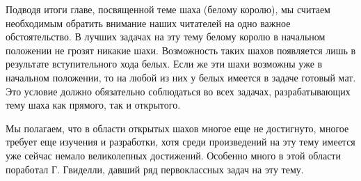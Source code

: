 Подводя итоги главе, посвященной теме шаха (белому королю), мы считаем необходимым обратить внимание наших читателей на одно важное обстоятельство. В лучших задачах на эту тему белому королю в начальном положении не грозят никакие шахи. Возможность таких шахов появляется лишь в результате вступительного хода белых. Если же эти шахи возможны уже в начальном положении, то на любой из них у белых имеется в задаче готовый мат. Это условие должно обязательно соблюдаться во всех задачах, разрабатывающих тему шаха как прямого, так и открытого.

Мы полагаем, что в области открытых шахов многое еще не достигнуто, многое требует еще изучения и разработки, хотя среди произведений на эту тему имеется уже сейчас немало великолепных достижений. Особенно много в этой области поработал Г. Гвиделли, давший ряд первоклассных задач на эту тему.

